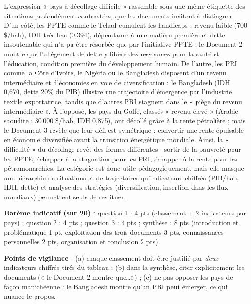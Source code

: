 \documentclass[11pt]{article}
\begin{document}
\begin{corrige}
\begin{enumerate}
L'expression « pays à décollage difficile » rassemble sous une même étiquette des situations profondément contrastées, que les documents invitent à distinguer. D'un côté, les PPTE comme le Tchad cumulent les handicaps : revenu faible (700 \$/hab), IDH très bas (0,394), dépendance à une matière première et dette insoutenable qui n'a pu être résorbée que par l'initiative PPTE ; le Document 2 montre que l'allègement de dette y libère des ressources pour la santé et l'éducation, condition première du développement humain. De l'autre, les PRI comme la Côte d'Ivoire, le Nigéria ou le Bangladesh disposent d'un revenu intermédiaire et d'économies en voie de diversification : le Bangladesh (IDH 0,670, dette 20\% du PIB) illustre une trajectoire d'émergence par l'industrie textile exportatrice, tandis que d'autres PRI stagnent dans le « piège du revenu intermédiaire ». À l'opposé, les pays du Golfe, classés « revenu élevé » (Arabie saoudite : 30\,000 \$/hab, IDH 0,875), ont décollé grâce à la rente pétrolière ; mais le Document 3 révèle que leur défi est symétrique : convertir une rente épuisable en économie diversifiée avant la transition énergétique mondiale. Ainsi, la « difficulté » du décollage revêt des formes différentes : sortir de la pauvreté pour les PPTE, échapper à la stagnation pour les PRI, échapper à la rente pour les pétromonarchies. La catégorie est donc utile pédagogiquement, mais elle masque une hiérarchie de situations et de trajectoires qu'indicateurs chiffrés (PIB/hab, IDH, dette) et analyse des stratégies (diversification, insertion dans les flux mondiaux) permettent seuls de restituer.

\textbf{Barème indicatif (sur 20) :} question 1 : 4 pts (classement + 2 indicateurs par pays) ; question 2 : 4 pts ; question 3 : 4 pts ; synthèse : 8 pts (introduction et problématique 1 pt, exploitation des trois documents 3 pts, connaissances personnelles 2 pts, organisation et conclusion 2 pts).

\textbf{Points de vigilance :} (a) chaque classement doit être justifié par \emph{deux} indicateurs chiffrés tirés du tableau ; (b) dans la synthèse, citer explicitement les documents (« le Document 2 montre que\ldots ») ; (c) ne pas opposer les pays de façon manichéenne : le Bangladesh montre qu'un PRI peut émerger, ce qui nuance le propos.
\end{enumerate}
\end{corrige}
\end{document}
